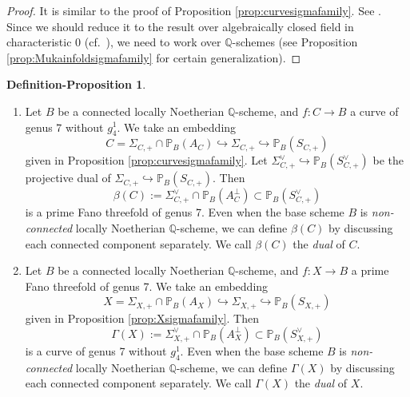 \documentclass[autodetect-engine, a4paper]{amsart}
\theoremstyle{definition}
\newtheorem{defn-prop}[thm]{Definition-Proposition}
\def\P{{\mathbb P}}
\def\Q{{\mathbb Q}}
\newcommand{\cred}{\color{black}}
\begin{document}
\begin{proof}
It is similar to the proof of Proposition \ref{prop:curvesigmafamily}.
See \cite[Proposition 5.11 and Remark 5.12]{Kuznetsovfamily}.
Since we should reduce it to the result over {\cred algebraically closed field in characteristic $0$} (cf.\ \cite[Section 6]{MukaiSugakuShintenkaiEnglish}), we need to work over $\Q$-schemes (see Proposition \ref{prop:Mukainfoldsigmafamily} for certain generalization).
\end{proof}

\begin{defn-prop}
\label{defn-prop:dualvariety}
\begin{enumerate}
\item 
Let $B$ be a {\cred connected locally Noetherian} $\Q$-scheme, and $f\colon C \rightarrow B$ a curve of genus 7 without $g_4^1$.
We take an embedding 
\[
C = \Sigma_{C,+} \cap \P_{B} (A_{C}) \hookrightarrow \Sigma_{C, +} \hookrightarrow \P_{B} (S_{C, +})
\]
given in Proposition \ref{prop:curvesigmafamily}.
Let $\Sigma_{C, +}^{\vee} \hookrightarrow \P_{B} (S_{C,+}^{\vee})$ be the projective dual of 
$
\Sigma_{C,+}\hookrightarrow \P_{B} (S_{C,+}).
$
Then 
\[
\beta(C) := \Sigma_{C,+}^{\vee} \cap \P_{B} (A_{C}^{\perp}) \subset \P_{B} (S_{C,+}^{\vee})
\]
is a prime Fano threefold of genus 7.
{\cred Even when the base scheme $B$ is \emph{non-connected} locally Noetherian $\Q$-scheme, we can define $\beta (C)$ by discussing each connected component separately.
We call $\beta(C)$ the \emph{dual} of $C$.
}
\item
Let $B$ be a {\cred connected locally Noetherian} $\Q$-scheme, and $f\colon X \rightarrow B$ a prime Fano threefold of genus 7.
We take an embedding 
\[
X = \Sigma_{X, +} \cap \P_{B} (A_{X})
\hookrightarrow \Sigma_{X, +} \hookrightarrow \P_{B} (S_{X, +})
\]
given in Proposition \ref{prop:Xsigmafamily}.
Then
\[
\Gamma(X) := \Sigma_{X,+}^{\vee} \cap \P_{B} (A_{X}^{\perp}) \subset \P_{B} (S_{X,+}^{\vee})
\]
is a curve of genus 7 without $g_4^1$.
{\cred Even when the base scheme $B$ is \emph{non-connected} locally Noetherian $\Q$-scheme, we can define $\Gamma (X)$ by discussing each connected component separately.
We call $\Gamma(X)$ the \emph{dual} of $X$.}
\end{enumerate}
\end{defn-prop}
\end{document}
